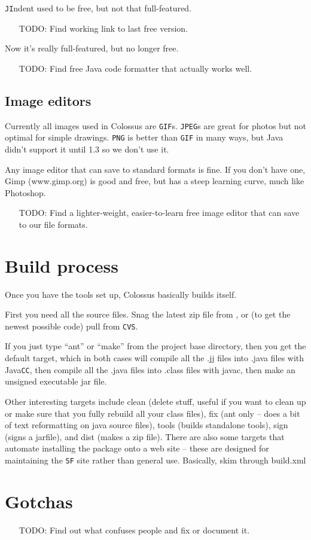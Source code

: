 \documentclass{article}
\begin{document}
\texttt{JI}ndent used to be free, but not that full-featured.  
\begin{itemize}
\item[TODO:]  Find working link to last free version.
\end{itemize}
Now it's really full-featured, but no longer free.
\begin{itemize}
\item[TODO:]  Find free Java code formatter that actually works well.
\end{itemize}

\subsection{Image editors}

Currently all images used in Colossus are \texttt{GIF}s.  \texttt{JPEG}s are great for
photos but not optimal for simple drawings.  \texttt{PNG} is better than \texttt{GIF} 
in many ways, but Java didn't support it until 1.3 so we don't use it.

Any image editor that can save to standard formats is fine.  If you
don't have one, Gimp (www.gimp.org) is good and free, but has a steep
learning curve, much like Photoshop.  
\begin{itemize}
\item[TODO:]  Find a lighter-weight, easier-to-learn free image editor that 
can save to our file formats.
\end{itemize}

\section{Build process}

Once you have the tools set up, Colossus basically builds itself.

First you need all the source files.  Snag the latest zip file from 
, or (to get
the newest possible code) pull from \texttt{CVS}.

If you just type ``ant'' or ``make'' from the project base directory,
then you get the default target, which in both cases will compile
all the .jj files into .java files with Java\texttt{CC}, then compile all
the .java files into .class files with javac, then make an unsigned
executable jar file.

Other interesting targets include clean (delete stuff, useful if
you want to clean up or make sure that you fully rebuild all your
class files), fix (ant only -- does a bit of text reformatting on
java source files), tools (builds standalone tools), sign (signs
a jarfile), and dist (makes a zip file).  There are also some
targets that automate installing the package onto a web site --
these are designed for maintaining the \texttt{SF} site rather than general
use.  Basically, skim through build.xml

\section{Gotchas}

\begin{itemize}
\item[TODO:] Find out what confuses people and fix or document it.
\end{itemize}



\end{document}
